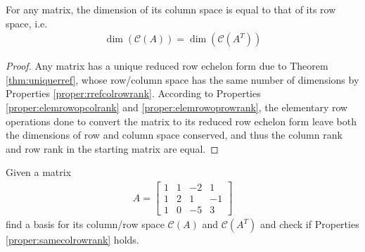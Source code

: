 \begin{proper}
\label{proper:samecolrowrank}
For any matrix, the dimension of its column space is equal to that of its row space, i.e.\
\begin{align}
\dim(\mathcal{C}(A)) = \dim(\mathcal{C}(A^T))
\end{align}
\end{proper}
\begin{proof}
Any matrix has a unique reduced row echelon form due to Theorem \ref{thm:uniquerref}, whose row/column space has the same number of dimensions by Properties \ref{proper:rrefcolrowrank}. According to Properties \ref{proper:elemrowopcolrank} and \ref{proper:elemrowoprowrank}, the elementary row operations done to convert the matrix to its reduced row echelon form leave both the dimensions of row and column space conserved, and thus the column rank and row rank in the starting matrix are equal.
\end{proof}
\begin{exmp}
\label{exmp:colrowspace}
Given a matrix
\begin{align*}
A = 
\begin{bmatrix}
1 & 1 & -2 & 1 \\
1 & 2 & 1 & -1 \\
1 & 0 & -5 & 3
\end{bmatrix}
\end{align*}
find a basis for its column/row space $\mathcal{C}(A)$ and $\mathcal{C}(A^T)$ and check if Properties \ref{proper:samecolrowrank} holds.
\end{exmp}
